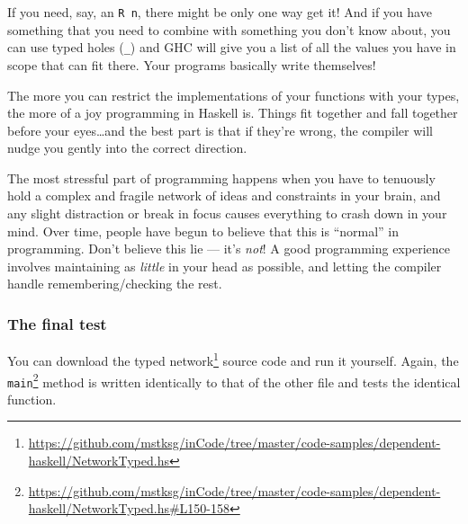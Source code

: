 \documentclass[]{article}
\newenvironment{Shaded}{}{}
\newcommand{\KeywordTok}[1]{\textcolor[rgb]{0.00,0.44,0.13}{\textbf{{#1}}}}
\newcommand{\CommentTok}[1]{\textcolor[rgb]{0.38,0.63,0.69}{\textit{{#1}}}}
\newcommand{\NormalTok}[1]{{#1}}
\renewcommand{\href}[2]{#2\footnote{\url{#1}}}
\begin{document}
If you need, say, an \texttt{R\ n}, there might be only one way get it! And if
you have something that you need to combine with something you don't know about,
you can use typed holes (\texttt{\_}) and GHC will give you a list of all the
values you have in scope that can fit there. Your programs basically write
themselves!

The more you can restrict the implementations of your functions with your types,
the more of a joy programming in Haskell is. Things fit together and fall
together before your eyes\ldots{}and the best part is that if they're wrong, the
compiler will nudge you gently into the correct direction.

The most stressful part of programming happens when you have to tenuously hold a
complex and fragile network of ideas and constraints in your brain, and any
slight distraction or break in focus causes everything to crash down in your
mind. Over time, people have begun to believe that this is ``normal'' in
programming. Don't believe this lie --- it's \emph{not}! A good programming
experience involves maintaining as \emph{little} in your head as possible, and
letting the compiler handle remembering/checking the rest.

\subsubsection{The final test}\label{the-final-test}

You can download the
\href{https://github.com/mstksg/inCode/tree/master/code-samples/dependent-haskell/NetworkTyped.hs}{typed
network} source code and run it yourself. Again, the
\href{https://github.com/mstksg/inCode/tree/master/code-samples/dependent-haskell/NetworkTyped.hs\#L150-158}{\texttt{main}}
method is written identically to that of the other file and tests the identical
function.

\begin{Shaded}
\end{Shaded}
\end{document}
